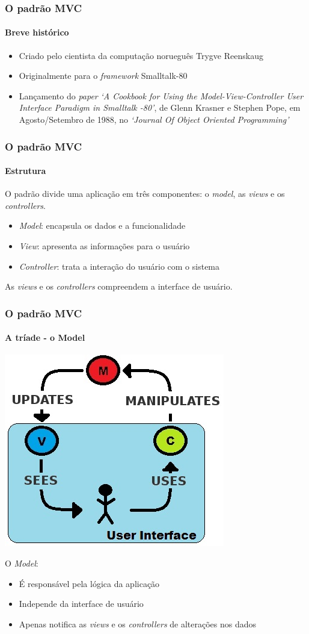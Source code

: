 \documentclass{beamer}
\begin{document}
\begin{frame}
\frametitle{O padrão MVC}
\framesubtitle{Breve histórico}
\begin{itemize}
\item {Criado pelo cientista da computação norueguês Trygve Reenskaug}
\item {Originalmente para o \textit{framework} Smalltalk-80}
\item {Lançamento do \textit{paper} \textit{`A Cookbook for Using the Model-View-Controller User Interface Paradigm in Smalltalk -80'}, de Glenn Krasner e Stephen Pope, em Agosto/Setembro de 1988, no \textit{`Journal Of Object Oriented Programming'}}
\end{itemize}
\end{frame}

\begin{frame}
\frametitle{O padrão MVC}
\framesubtitle{Estrutura}
	O padrão divide uma aplicação em três componentes: o \textit{model}, as \textit{views} e os \textit{controllers}.

\begin{itemize}
	\item \textit{Model}: encapsula os dados e a funcionalidade
	\item \textit{View}: apresenta as informações para o usuário
  \item \textit{Controller}: trata a interação do usuário com o sistema
\end{itemize}
 
  As \textit{views} e os \emph{controllers} compreendem a interface de usuário.
\end{frame}

\begin{frame}
\frametitle{O padrão MVC}
\framesubtitle{A tríade - o Model}
\begin{center}
	\includegraphics[scale=0.4]{MVC.jpg}
\end{center}
O \textit{Model}:
  \begin{itemize}
    \item {É responsável pela lógica da aplicação}
    \item {Independe da interface de usuário}
    \item {Apenas notifica as \textit{views} e os \textit{controllers} de alterações nos dados}
  \end{itemize}
\end{frame}
\end{document}
